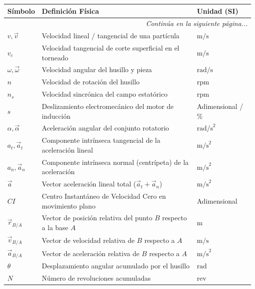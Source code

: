 \documentclass[12pt,a4paper]{article}
\begin{document}
\begin{center}
\small
\renewcommand{\arraystretch}{1.10}
\begin{longtable}{p{1.8cm} p{10.2cm} >{\centering\arraybackslash}p{2.6cm}}
    \toprule
    \textbf{Símbolo} & \textbf{Definición Física} & \textbf{Unidad (SI)} \\
    \midrule
    \endhead
    \midrule
    \multicolumn{3}{r}{\footnotesize\textit{Continúa en la siguiente página...}} \\
    \bottomrule
    \endfoot
    \bottomrule
    \endlastfoot

    $v, \vec{v}$ & Velocidad lineal / tangencial de una partícula & $\text{m/s}$ \\
    $v_c$ & Velocidad tangencial de corte superficial en el torneado & $\text{m/s}$ \\
    $\omega, \vec{\omega}$ & Velocidad angular del husillo y pieza & $\text{rad/s}$ \\
    $n$ & Velocidad de rotación del husillo & $\text{rpm}$ \\
    $n_s$ & Velocidad sincrónica del campo estatórico & $\text{rpm}$ \\
    $s$ & Deslizamiento electromecánico del motor de inducción & Adimensional / \% \\
    $\alpha, \vec{\alpha}$ & Aceleración angular del conjunto rotatorio & $\text{rad/s}^2$ \\
    $a_t, \vec{a}_t$ & Componente intrínseca tangencial de la aceleración lineal & $\text{m/s}^2$ \\
    $a_n, \vec{a}_n$ & Componente intrínseca normal (centrípeta) de la aceleración & $\text{m/s}^2$ \\
    $\vec{a}$ & Vector aceleración lineal total ($\vec{a}_t + \vec{a}_n$) & $\text{m/s}^2$ \\
    $CI$ & Centro Instantáneo de Velocidad Cero en movimiento plano & Adimensional \\
    $\vec{r}_{B/A}$ & Vector de posición relativa del punto $B$ respecto a la base $A$ & $\text{m}$ \\
    $\vec{v}_{B/A}$ & Vector de velocidad relativa de $B$ respecto a $A$ & $\text{m/s}$ \\
    $\vec{a}_{B/A}$ & Vector de aceleración relativa de $B$ respecto a $A$ & $\text{m/s}^2$ \\
    $\theta$ & Desplazamiento angular acumulado por el husillo & $\text{rad}$ \\
    $N$ & Número de revoluciones acumuladas & $\text{rev}$ \\

\end{longtable}
\end{center}
\end{document}
